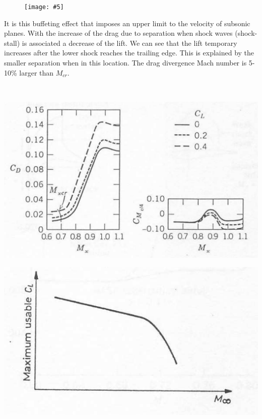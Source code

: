 \documentclass[british,french,11pt, a4paper, openany]{article}
\newcommand{\wrapfig}[6]{%
	\begin{figure}%
		\vspace{-5mm}%
		\texttt{[image: \#5]}%
		\captionof{figure}{}%
		\label{#6}%
	\end{figure}%
}
\begin{document}
\wrapfig{7}{l}{5.5}{0.15}{ch6/4}{fig:6.4}
It is this buffeting effect that imposes an upper limit to the velocity of subsonic planes. With the increase of the drag due to separation when shock waves (shock-stall) is associated a decrease of the lift. We can see that the lift temporary increases after the lower shock reaches the trailing edge. This is explained by the smaller separation when in this location. The drag divergence Mach number is 5-10\% larger than $M_{cr}$. 

\ \\

\begin{center}
	\begin{minipage}{0.4\textwidth}
		\includegraphics[scale=0.15]{ch6/5}
		\label{fig:6.5}
	\end{minipage}
	\begin{minipage}{0.4\textwidth}
		\includegraphics[scale=0.4]{ch6/6}
		\label{fig:6.6}
	\end{minipage}
\end{center}
\end{document}
